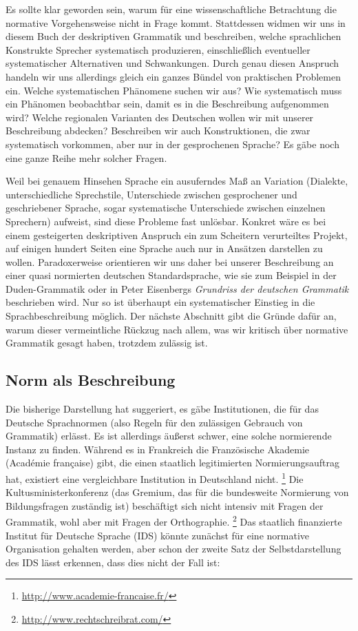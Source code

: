 Es sollte klar geworden sein, warum für eine wissenschaftliche Betrachtung die normative Vorgehensweise nicht in Frage kommt.
Stattdessen widmen wir uns in diesem Buch der deskriptiven Grammatik und beschreiben, welche sprachlichen Konstrukte Sprecher systematisch produzieren, einschließlich eventueller systematischer Alternativen und Schwankungen.
Durch genau diesen Anspruch handeln wir uns allerdings gleich ein ganzes Bündel von praktischen Problemen ein.
Welche systematischen Phänomene suchen wir aus?
Wie systematisch muss ein Phänomen beobachtbar sein, damit es in die Beschreibung aufgenommen wird?
Welche regionalen Varianten des Deutschen wollen wir mit unserer Beschreibung abdecken?
Beschreiben wir auch Konstruktionen, die zwar systematisch vorkommen, aber nur in der gesprochenen Sprache?
Es gäbe noch eine ganze Reihe mehr solcher Fragen.

Weil bei genauem Hinsehen Sprache ein ausuferndes Maß an Variation (Dialekte, unterschiedliche Sprechstile, Unterschiede zwischen gesprochener und geschriebener Sprache, sogar systematische Unterschiede zwischen einzelnen Sprechern) aufweist, sind diese Probleme fast unlösbar.
Konkret wäre es bei einem gesteigerten deskriptiven Anspruch ein zum Scheitern verurteiltes Projekt, auf einigen hundert Seiten eine Sprache auch nur in Ansätzen darstellen zu wollen.
Paradoxerweise orientieren wir uns daher bei unserer Beschreibung an einer quasi normierten deutschen Standardsprache, wie sie zum Beispiel in der Duden-Grammatik oder in Peter Eisenbergs \textit{Grundriss der deutschen Grammatik} \citep{Eisenberg1,Eisenberg2} beschrieben wird.
Nur so ist überhaupt ein systematischer Einstieg in die Sprachbeschreibung möglich.
Der nächste Abschnitt gibt die Gründe dafür an, warum dieser vermeintliche Rückzug nach allem, was wir kritisch über normative Grammatik gesagt haben, trotzdem zulässig ist.

\subsection{Norm als Beschreibung}

\label{sec:normalsbeschreibung}

Die bisherige Darstellung hat suggeriert, es gäbe Institutionen, die für das Deutsche Sprachnormen (also Regeln für den zulässigen Gebrauch von Grammatik) erlässt.
Es ist allerdings äußerst schwer, eine solche normierende Instanz zu finden.
Während es \zB in Frankreich die Französische Akademie (Académie française) gibt, die einen staatlich legitimierten Normierungsauftrag hat, existiert eine vergleichbare Institution in Deutschland nicht.%
\footnote{\raggedright{\url{http://www.academie-francaise.fr/}}}
Die Kultusministerkonferenz (das Gremium, das für die bundesweite Normierung von Bildungsfragen zuständig ist) beschäftigt sich nicht intensiv mit Fragen der Grammatik, wohl aber mit Fragen der Orthographie.%
\footnote{\url{http://www.rechtschreibrat.com/}}
Das staatlich finanzierte Institut für Deutsche Sprache (IDS) könnte zunächst für eine normative Organisation gehalten werden, aber schon der zweite Satz der Selbstdarstellung des IDS lässt erkennen, dass dies nicht der Fall ist:


